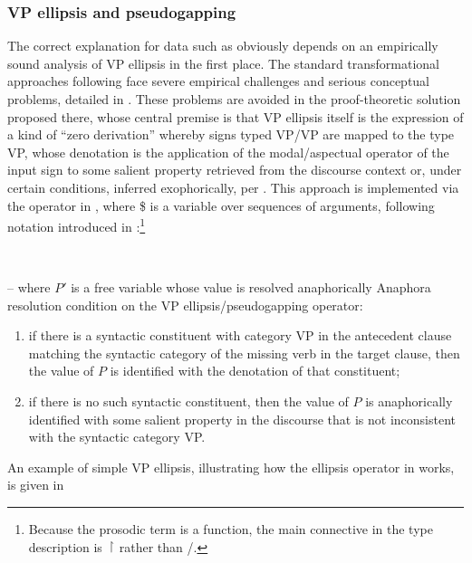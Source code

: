 \documentclass[output=paper,colorlinks,citecolor=brown]{langscibook}
\begin{document}
\subsubsection{VP ellipsis and pseudogapping}\label{subsubsec:VPE}

The correct explanation for data such as  obviously
depends on an empirically sound analysis of VP ellipsis in the first
place. The standard transformational approaches following \citet{kuno1981}
face severe empirical challenges and serious conceptual problems,
detailed in \citet{kubota-levine-pseudo}. These problems are avoided in the
proof-theoretic solution proposed there, whose central premise is that VP
ellipsis itself is the expression of a kind of ``zero derivation''
whereby signs typed VP/VP are mapped to the type VP, whose denotation
is the application of the modal/aspectual operator of the input sign
to some salient property retrieved from the discourse context or,
under certain conditions, inferred exophorically, per
\citet{MillerPullum13}. This approach is implemented via the operator in
, where \$ is a variable over sequences of arguments,
following notation introduced in :\footnote{Because the
prosodic term is a function, the main connective in the type
description is \ensuremath{\vs} rather than /.}

\begin{exe}
 \ex\label{ellipseOp1}
   \\

   -- where $P'$ is a free variable whose value is
  resolved anaphorically
 \ex\label{Acondition}
  Anaphora resolution condition on the VP ellipsis/pseudogapping
  operator:
  \begin{enumerate}
   \item
    if there is a syntactic  constituent
    with category VP in the antecedent clause matching the
    syntactic  category of the missing verb in the target clause,
    then the value of $P$ is identified with the denotation of that constituent;
   \item
    if there is no such syntactic  constituent, then the value of $P$  is anaphorically
    identified with some salient property in the discourse that is not
    inconsistent with the syntactic  category VP.
  \end{enumerate}
\end{exe}
An example of simple VP ellipsis, illustrating how the ellipsis operator
in  works, is given in 
\end{document}
